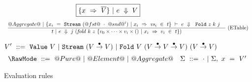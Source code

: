 \begin{figure*}
$$
\boxed{\{x~\Rightarrow~\overline{V}\}~|~e~\Downarrow~V}
$$
$$
\enskip \frac {\displaystyle 
  @Aggregate@~|~\{x_i~=~\texttt{Stream}~(@fst@~\cdot~@snd@^i)~|~x_i~\Rightarrow~\mathit{vs}_i~\in~t\}~\vdash~e~\Downarrow~~\texttt{Fold}~z~k~j
  \quad
} {\displaystyle 
  t~|~e~\Downarrow~
  j~(\mathit{fold}~k~z~\{v_0 \times \cdots \times v_i \times ()~|~x_i~\Rightarrow~v_i~\in~t\})
} \  \mbox{(ETable)} \enskip
$$

$$
V'~     ::=~\VValue{V}
        ~|~\VStream {(V \stackrel{\bullet}{\to} V)}
        ~|~\VFold{V}{(V \stackrel{\bullet}{\to} V \stackrel{\bullet}{\to} V)}
                    {(V \stackrel{\bullet}{\to} V)}
$$
$$
\begin{array}{ll}

\RawMode~::=~@Pure@~|~@Element@~|~@Aggregate@

&

\Sigma~::=~\cdot~|~\Sigma,~x~=~V'

\end{array}
$$


\caption{Evaluation rules}
\label{fig:source:eval}
\end{figure*}


